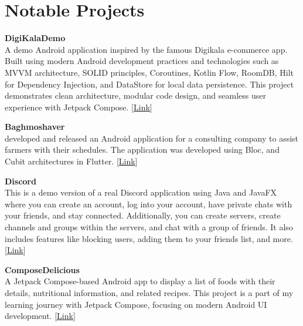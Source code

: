 \documentclass[a4paper,12pt]{article} %
\begin{document}
\section{Notable Projects}  

\begin{small}
\textbf{DigiKalaDemo}\\
A demo Android application inspired by the famous Digikala e-commerce app. Built using modern Android development practices and technologies such as MVVM architecture, SOLID principles, Coroutines, Kotlin Flow, RoomDB, Hilt for Dependency Injection, and DataStore for local data persistence. This project demonstrates clean architecture, modular code design, and seamless user experience with Jetpack Compose.
[\href{https://github.com/aliamrol/digikalademo}{Link}]


\textbf{Baghmoshaver}\\
developed and released an Android application for a consulting company to assist farmers with their schedules. The application was developed using Bloc, and Cubit architectures in Flutter. [\href{https://cafebazaar.ir/app/com.example.bagh_moshaver}{Link}]
\end{small}

\textbf{Discord}\\
This is a demo version of a real Discord application using Java and JavaFX where you can create an account, log into
your account, have private chats with your friends, and stay connected. Additionally, you can
create servers, create channels and groups within the servers, and chat with a group of friends. It also
includes features like blocking users, adding them to your friends list, and more.
[\href{https://github.com/Aliamrol/Discord}{Link}]

\textbf{ComposeDelicious}\\
A Jetpack Compose-based Android app to display a list of foods with their details, nutritional information, and related recipes. This project is a part of my learning journey with Jetpack Compose, focusing on modern Android UI development.
[\href{https://github.com/Aliamrol/ComposeDelicious}{Link}]
\end{document}
